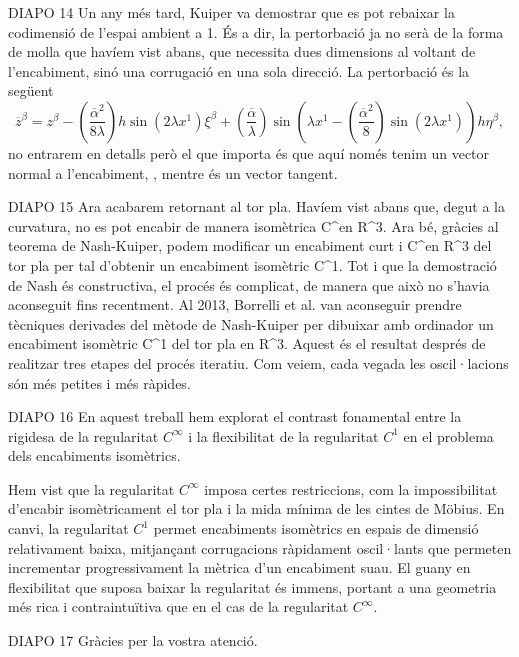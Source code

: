 DIAPO 14
Un any més tard, Kuiper va demostrar que es pot rebaixar la codimensió de l'espai ambient a 1. És a dir, la pertorbació ja no serà de la forma de molla que havíem vist abans, que necessita dues dimensions al voltant de l'encabiment, sinó una corrugació en una sola direcció.
La pertorbació és la següent
\begin{equation*}
    \boxed{
        \overline{z}^\beta = z^\beta - \left(\frac{\overline \alpha^2}{8\lambda}\right)h\sin\left(2\lambda x^1\right)\xi^\beta + \left(\frac{\overline\alpha}{\lambda}\right)\sin\left(\lambda x^1 - \left(\frac{\overline\alpha ^2}{8}\right)\sin\left(2\lambda x^1\right)\right)h\eta^\beta,
        }
\end{equation*}
no entrarem en detalls però el que importa és que aquí només tenim un vector normal a l'encabiment, \eta, mentre \xi és un vector tangent.

DIAPO 15
Ara acabarem retornant al tor pla. Havíem vist abans que, degut a la curvatura, no es pot encabir de manera isomètrica C^\infty en R^3. Ara bé, gràcies al teorema de Nash-Kuiper, podem modificar un encabiment curt i C^\infty en R^3 del tor pla per tal d'obtenir un encabiment isomètric C^1. Tot i que la demostració de Nash és constructiva, el procés és complicat, de manera que això no s'havia aconseguit fins recentment. 
Al 2013, Borrelli et al. van aconseguir prendre tècniques derivades del mètode de Nash-Kuiper per dibuixar amb ordinador un encabiment isomètric C^1 del tor pla en R^3. 
Aquest és el resultat després de realitzar tres etapes del procés iteratiu. Com veiem, cada vegada les oscil·lacions són més petites i més ràpides. 

DIAPO 16
En aquest treball hem explorat el contrast fonamental entre la rigidesa de la regularitat $C^\infty$ i la flexibilitat de la regularitat $C^1$ en el problema dels encabiments isomètrics. 

Hem vist que la regularitat $C^\infty$ imposa certes restriccions, com la impossibilitat d'encabir isomètricament el tor pla i la mida mínima de les cintes de Möbius. En canvi, la regularitat $C^1$ permet encabiments isomètrics en espais de dimensió relativament baixa, mitjançant corrugacions ràpidament oscil·lants que permeten incrementar progressivament la mètrica d'un encabiment suau. El guany en flexibilitat que suposa baixar la regularitat és immens, portant a una geometria més rica i contraintuïtiva que en el cas de la regularitat $C^\infty$.

DIAPO 17
Gràcies per la vostra atenció. 